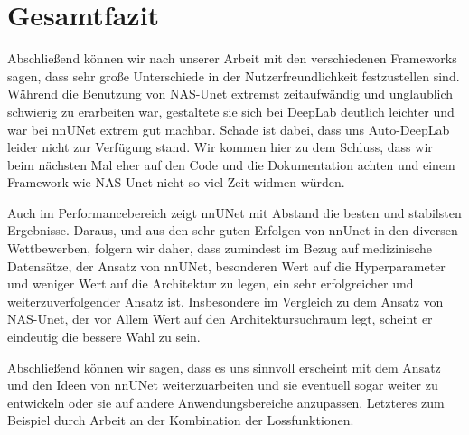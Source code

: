 \chapter{Gesamtfazit}
\label{ch:conclusion}



Abschließend können wir nach unserer Arbeit mit den verschiedenen Frameworks sagen, dass sehr große Unterschiede in der Nutzerfreundlichkeit festzustellen sind. Während die Benutzung von NAS-Unet extremst zeitaufwändig und unglaublich schwierig zu erarbeiten war, gestaltete sie sich bei DeepLab deutlich leichter und war bei nnUNet extrem gut machbar. Schade ist dabei, dass uns Auto-DeepLab leider nicht zur Verfügung stand. 
Wir kommen hier zu dem Schluss, dass wir beim nächsten Mal eher auf den Code und die Dokumentation achten und einem Framework wie NAS-Unet nicht so viel Zeit widmen würden. 

Auch im Performancebereich zeigt nnUNet mit Abstand die besten und stabilsten Ergebnisse. Daraus, und aus den sehr guten Erfolgen von nnUnet in den diversen Wettbewerben, folgern wir daher, dass zumindest im Bezug auf medizinische Datensätze, der Ansatz von nnUNet, besonderen Wert auf die Hyperparameter und weniger Wert auf die Architektur zu legen, ein sehr erfolgreicher und weiterzuverfolgender Ansatz ist. Insbesondere im Vergleich zu dem Ansatz von NAS-Unet, der vor Allem Wert auf den Architektursuchraum legt, scheint er eindeutig die bessere Wahl zu sein. 

Abschließend können wir sagen, dass es uns sinnvoll erscheint mit dem Ansatz und den Ideen von nnUNet weiterzuarbeiten und sie eventuell sogar weiter zu entwickeln oder sie auf andere Anwendungsbereiche anzupassen. Letzteres zum Beispiel durch Arbeit an der Kombination der Lossfunktionen. 





